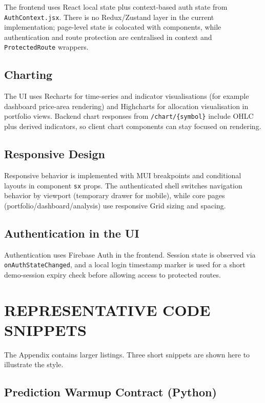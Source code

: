 \documentclass[12pt,a4paper]{report}
\numberwithin{equation}{chapter}
\begin{document}
The frontend uses React local state plus context-based auth state from \texttt{AuthContext.jsx}. There is no Redux/Zustand layer in the current implementation; page-level state is colocated with components, while authentication and route protection are centralised in context and \texttt{ProtectedRoute} wrappers.

\subsection{Charting}

The UI uses Recharts for time-series and indicator visualisations (for example dashboard price-area rendering) and Highcharts for allocation visualisation in portfolio views. Backend chart responses from \texttt{/chart/\{symbol\}} include OHLC plus derived indicators, so client chart components can stay focused on rendering.

\subsection{Responsive Design}

Responsive behavior is implemented with MUI breakpoints and conditional layouts in component \texttt{sx} props. The authenticated shell switches navigation behavior by viewport (temporary drawer for mobile), while core pages (portfolio/dashboard/analysis) use responsive Grid sizing and spacing.

\subsection{Authentication in the UI}

Authentication uses Firebase Auth in the frontend. Session state is observed via \texttt{onAuthStateChanged}, and a local login timestamp marker is used for a short demo-session expiry check before allowing access to protected routes.

\section{REPRESENTATIVE CODE SNIPPETS}

The Appendix contains larger listings. Three short snippets are shown here to illustrate the style.

\subsection{Prediction Warmup Contract (Python)}
\end{document}
